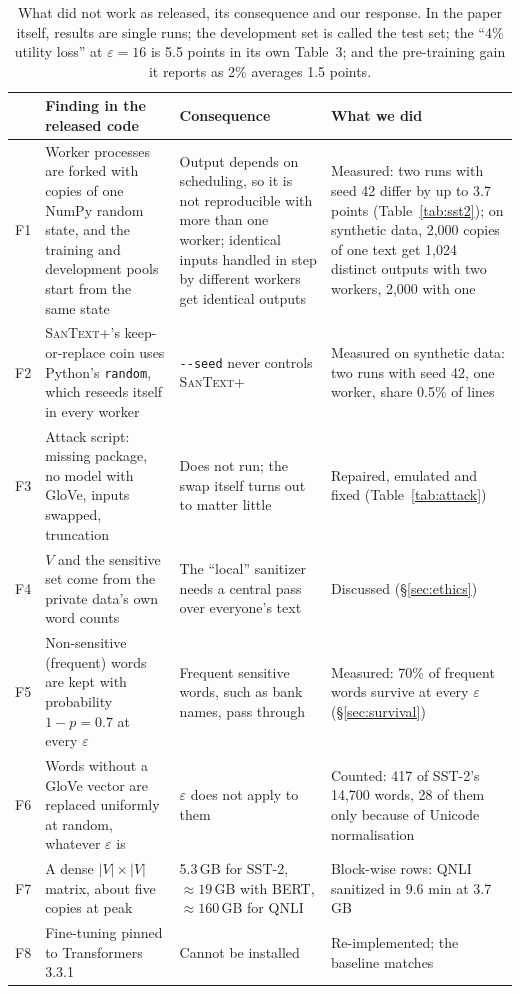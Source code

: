 \documentclass[11pt]{article}
\newcommand{\santextp}{\textsc{SanText}+}
\begin{document}
\begin{table}[t]
\centering\small
\begin{tabularx}{\textwidth}{@{}lLLL@{}}
\toprule
 & Finding in the released code & Consequence & What we did \\
\midrule
F1 & Worker processes are forked with copies of one NumPy random state, and the training and development pools start from the same state & Output depends on scheduling, so it is not reproducible with more than one worker; identical inputs handled in step by different workers get identical outputs & Measured: two runs with seed 42 differ by up to 3.7 points (Table~\ref{tab:sst2}); on synthetic data, 2,000 copies of one text get 1,024 distinct outputs with two workers, 2,000 with one \\
F2 & \santextp{}'s keep-or-replace coin uses Python's \texttt{random}, which reseeds itself in every worker & \texttt{-{}-seed} never controls \santextp{} & Measured on synthetic data: two runs with seed 42, one worker, share 0.5\% of lines \\
F3 & Attack script: missing package, no model with GloVe, inputs swapped, truncation & Does not run; the swap itself turns out to matter little & Repaired, emulated and fixed (Table~\ref{tab:attack}) \\
F4 & $V$ and the sensitive set come from the private data's own word counts & The ``local'' sanitizer needs a central pass over everyone's text & Discussed (§\ref{sec:ethics}) \\
F5 & Non-sensitive (frequent) words are kept with probability $1-p = 0.7$ at every $\varepsilon$ & Frequent sensitive words, such as bank names, pass through & Measured: 70\% of frequent words survive at every $\varepsilon$ (§\ref{sec:survival}) \\
F6 & Words without a GloVe vector are replaced uniformly at random, whatever $\varepsilon$ is & $\varepsilon$ does not apply to them & Counted: 417 of SST-2's 14,700 words, 28 of them only because of Unicode normalisation \\
F7 & A dense $|V| \times |V|$ matrix, about five copies at peak & 5.3\,GB for SST-2, ${\approx}19$\,GB with BERT, ${\approx}160$\,GB for QNLI & Block-wise rows: QNLI sanitized in 9.6 min at 3.7\,GB \\
F8 & Fine-tuning pinned to Transformers 3.3.1 & Cannot be installed & Re-implemented; the baseline matches \\
\bottomrule
\end{tabularx}
\caption{What did not work as released, its consequence and our response. In the paper itself, results are single runs; the development set is called the test set; the ``4\% utility loss'' at $\varepsilon=16$ is 5.5 points in its own Table~3; and the pre-training gain it reports as 2\% averages 1.5 points.}
\label{tab:findings}
\end{table}
\end{document}
